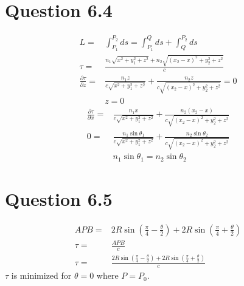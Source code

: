 \documentclass[12pt, a4paper]{article}
\begin{document}
\section*{Question 6.4}
\begin{align*}
L =& \int_{P_1}^{P_2}ds = \int_{P_1}^{Q}ds + \int_{Q}^{P_2}ds
\\	
\tau =& \frac{n_1\sqrt{x^2+y_1^2+z^2} + n_2\sqrt{(x_2-x)^2+y_2^2+z^2}}{c}
\\
\frac{\partial\tau}{\partial z} =& \frac{n_1z}{c\sqrt{x^2+y_1^2+z^2}} + \frac{n_2z}{c\sqrt{(x_2-x)^2+y_2^2+z^2}} = 0
\\
&\boxed{z=0}
\end{align*}
\begin{align*}
\frac{\partial\tau}{\partial x} =& \frac{n_1x}{c\sqrt{x^2+y_1^2+z^2}} + \frac{n_2(x_2-x)}{c\sqrt{(x_2-x)^2+y_2^2+z^2}} 
\\
0 =& \frac{n_1\sin\theta_1}{c\sqrt{x^2+y_1^2+z^2}} + \frac{n_2\sin\theta_2}{c\sqrt{(x_2-x)^2+y_2^2+z^2}}
\\
&\boxed{n_1\sin\theta_1 = n_2\sin\theta_2}
\end{align*}







\section*{Question 6.5}
\begin{align*}
APB =& 2R\sin\left(\frac{\pi}{4}-\frac{\theta}{2}\right) + 2R\sin\left(\frac{\pi}{4}+\frac{\theta}{2}\right)
\\
\tau =& \frac{APB}{c}
\\
\tau =& \frac{2R\sin\left(\frac{\pi}{4}-\frac{\theta}{2}\right) + 2R\sin\left(\frac{\pi}{4}+\frac{\theta}{2}\right)}{c}
\end{align*}
$\tau$ is minimized for $\theta=0$ where $P = P_0$.
\end{document}
